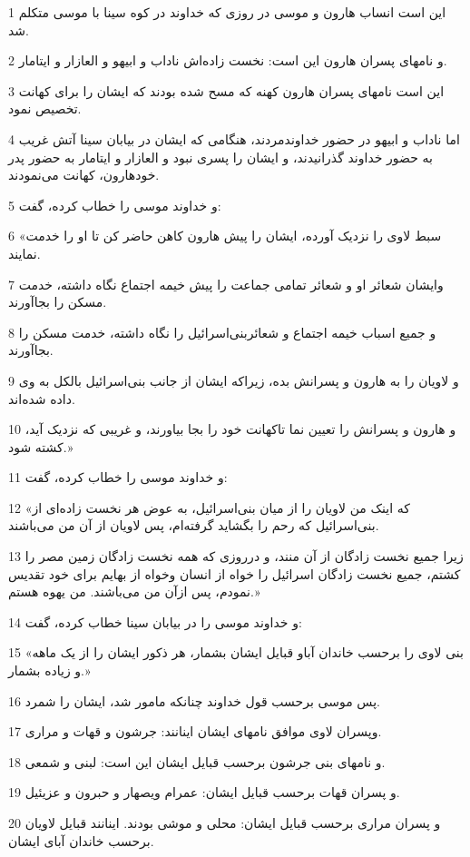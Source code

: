 \par 1 این است انساب هارون و موسی در روزی که خداوند در کوه سینا با موسی متکلم شد.
\par 2 و نامهای پسران هارون این است: نخست زاده‌اش ناداب و ابیهو و العازار و ایتامار.
\par 3 این است نامهای پسران هارون کهنه که مسح شده بودند که ایشان را برای کهانت تخصیص نمود.
\par 4 اما ناداب و ابیهو در حضور خداوندمردند، هنگامی که ایشان در بیابان سینا آتش غریب به حضور خداوند گذرانیدند، و ایشان را پسری نبود و العازار و ایتامار به حضور پدر خودهارون، کهانت می‌نمودند.
\par 5 و خداوند موسی را خطاب کرده، گفت:
\par 6 «سبط لاوی را نزدیک آورده، ایشان را پیش هارون کاهن حاضر کن تا او را خدمت نمایند.
\par 7 وایشان شعائر او و شعائر تمامی جماعت را پیش خیمه اجتماع نگاه داشته، خدمت مسکن را بجاآورند.
\par 8 و جمیع اسباب خیمه اجتماع و شعائربنی‌اسرائیل را نگاه داشته، خدمت مسکن را بجاآورند.
\par 9 و لاویان را به هارون و پسرانش بده، زیراکه ایشان از جانب بنی‌اسرائیل بالکل به وی داده شده‌اند.
\par 10 و هارون و پسرانش را تعیین نما تاکهانت خود را بجا بیاورند، و غریبی که نزدیک آید، کشته شود.»
\par 11 و خداوند موسی را خطاب کرده، گفت:
\par 12 «که اینک من لاویان را از میان بنی‌اسرائیل، به عوض هر نخست زاده‌ای از بنی‌اسرائیل که رحم را بگشاید گرفته‌ام، پس لاویان از آن من می‌باشند.
\par 13 زیرا جمیع نخست زادگان از آن منند، و درروزی که همه نخست زادگان زمین مصر را کشتم، جمیع نخست زادگان اسرائیل را خواه از انسان وخواه از بهایم برای خود تقدیس نمودم، پس ازآن من می‌باشند. من یهوه هستم.»
\par 14 و خداوند موسی را در بیابان سینا خطاب کرده، گفت:
\par 15 «بنی لاوی را برحسب خاندان آباو قبایل ایشان بشمار، هر ذکور ایشان را از یک ماهه و زیاده بشمار.» 
\par 16 پس موسی برحسب قول خداوند چنانکه مامور شد، ایشان را شمرد.
\par 17 وپسران لاوی موافق نامهای ایشان اینانند: جرشون و قهات و مراری.
\par 18 و نامهای بنی جرشون برحسب قبایل ایشان این است: لبنی و شمعی.
\par 19 و پسران قهات برحسب قبایل ایشان: عمرام ویصهار و حبرون و عزیئیل.
\par 20 و پسران مراری برحسب قبایل ایشان: محلی و موشی بودند. اینانند قبایل لاویان برحسب خاندان آبای ایشان.
